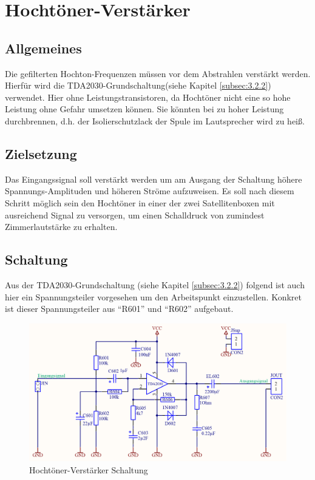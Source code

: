 \null\newpage
\section{Hochtöner-Verstärker}\label{sec:4.5}
\subsection{Allgemeines}\label{subsec:4.5.1}
Die gefilterten Hochton-Frequenzen müssen vor dem Abstrahlen verstärkt werden.
Hierfür wird die TDA2030-Grundschaltung(siehe Kapitel \ref{subsec:3.2.2}) verwendet.
Hier ohne Leistungstransistoren, da Hochtöner nicht eine so hohe Leistung ohne Gefahr umsetzen können.
Sie könnten bei zu hoher Leistung durchbrennen, d.h. der Isolierschutzlack der Spule im Lautsprecher wird zu heiß.

\subsection{Zielsetzung}\label{subsec:4.5.2}
Das Eingangssignal soll verstärkt werden um am Ausgang der Schaltung höhere Spannungs-Amplituden und höheren Ströme aufzuweisen. Es soll nach diesem Schritt möglich sein den Hochtöner in einer der zwei Satellitenboxen mit ausreichend Signal zu versorgen, um einen Schalldruck von zumindest Zimmerlautstärke zu erhalten. 

\subsection{Schaltung}\label{subsec:4.5.3}
Aus der TDA2030-Grundschaltung (siehe Kapitel \ref{subsec:3.2.2}) folgend ist auch hier ein Spannungsteiler vorgesehen um den Arbeitspunkt einzustellen.
Konkret ist dieser Spannungsteiler aus \enquote{R601} und \enquote{R602} aufgebaut.

\begin{figure} [H]
	\centering	
	\includegraphics[width=1\textwidth]{img/Print6/HTVerstaerker-Schem.PNG}
	\caption{Hochtöner-Verstärker Schaltung}
	\label {fig:4.5.3.1}
\end{figure}

